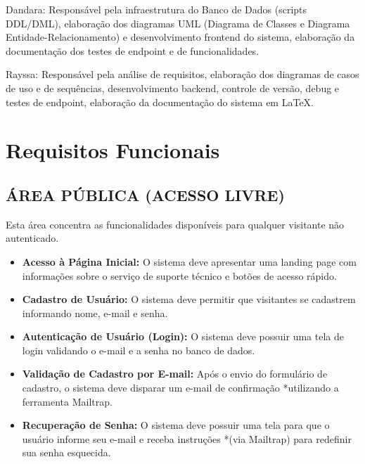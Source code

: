 \documentclass[a4paper, 12pt]{article}
\begin{document}
Dandara: Responsável pela infraestrutura do Banco de Dados (scripts DDL/DML), elaboração dos diagramas UML (Diagrama de Classes e Diagrama Entidade-Relacionamento) e desenvolvimento frontend do sistema,  elaboração da documentação dos testes de endpoint e de funcionalidades.

Rayssa: Responsável pela análise de requisitos, elaboração dos diagramas de casos de uso e de sequências, desenvolvimento backend, controle de versão, debug e testes de endpoint, elaboração da documentação do sistema em LaTeX.

\newpage    %
\section{Requisitos Funcionais}
\subsection{ÁREA PÚBLICA (ACESSO LIVRE)}
Esta área concentra as funcionalidades disponíveis para qualquer visitante não autenticado.
\begin{itemize}
    \item \textbf{Acesso à Página Inicial:} O sistema deve apresentar uma landing page com informações sobre o serviço de suporte técnico e botões de acesso rápido.
    \item \textbf{Cadastro de Usuário:} O sistema deve permitir que visitantes se cadastrem informando nome, e-mail e senha.
    \item \textbf{Autenticação de Usuário (Login):} O sistema deve possuir uma tela de login validando o e-mail e a senha no banco de dados.
    \item \textbf{Validação de Cadastro por E-mail:} Após o envio do formulário de cadastro, o sistema deve disparar um e-mail de confirmação *utilizando a ferramenta Mailtrap.
    \item \textbf{Recuperação de Senha:} O sistema deve possuir uma tela para que o usuário informe seu e-mail e receba instruções *(via Mailtrap) para redefinir sua senha esquecida.
\end{itemize}
\end{document}
